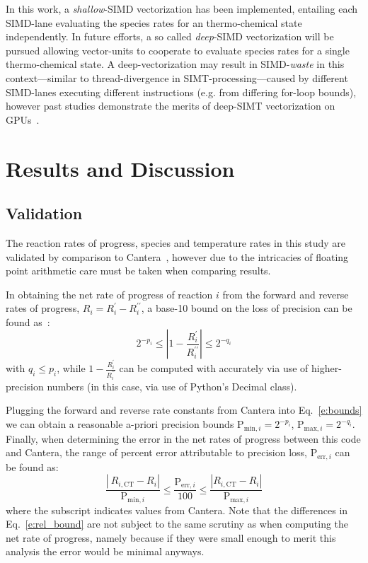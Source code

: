 \documentclass[12pt]{ussci}
\begin{document}
In this work, a \textit{shallow}-SIMD vectorization has been implemented, entailing each SIMD-lane evaluating the species rates for an thermo-chemical state independently.
In future efforts, a so called \textit{deep}-SIMD vectorization will be pursued allowing vector-units to cooperate to evaluate species rates for a single thermo-chemical state.
A deep-vectorization may result in SIMD-\textit{waste} in this context---similar to thread-divergence in SIMT-processing---caused by different SIMD-lanes executing different instructions (e.g. from differing for-loop bounds), however past studies demonstrate the merits of deep-SIMT vectorization on GPUs~\cite{Sewerin20151375}.

\section{Results and Discussion}
\subsection{Validation}
The reaction rates of progress, species and temperature rates in this study are validated by comparison to Cantera~\cite{Cantera}, however due to the intricacies of floating point arithmetic care must be taken when comparing results.

In obtaining the net rate of progress of reaction $i$ from the forward and reverse rates of progress, $R_{i} = R_{i}^{\prime} - R_{i}^{\prime\prime}$, a base-10 bound on the loss of precision can be found as~\cite{goldberg1991every}:
\begin{equation}
2^{-p_i} \le \left\lvert 1 - \frac{R_{i}^{\prime}}{R_{i}^{\prime\prime}} \right\rvert \le 2^{-q_i}
\label{e:bounds}
\end{equation}
with $q_i \le p_i$, while $1 - \frac{R_{i}^{\prime}}{R_{i}^{\prime\prime}}$ can be computed with accurately via use of higher-precision numbers (in this case, via use of Python's Decimal class).

Plugging the forward and reverse rate constants from Cantera into Eq.~\eqref{e:bounds} we can obtain a reasonable a-priori precision bounds $\text{P}_{\text{min},i} = 2^{-p_i}$, $\text{P}_{\text{max},i} = 2^{-q_i}$.
Finally, when determining the error in the net rates of progress between this code and Cantera, the range of percent error attributable to precision loss, $\text{P}_{\text{err},i}$ can be found as:
\begin{equation}
\frac{\left\lvert\ R_{i,\text{CT}} - R_{i}\right\rvert}{\text{P}_{\text{min},i}} \le
\frac{\text{P}_{\text{err},i}}{100} \le \frac{\left\lvert R_{i,\text{CT}} - R_{i} \right\rvert}{\text{P}_{\text{max},i}}
\label{e:rel_bound}
\end{equation}
where the  subscript indicates values from Cantera.
Note that the differences in Eq.~\eqref{e:rel_bound} are not subject to the same scrutiny as when computing the net rate of progress, namely because if they were small enough to merit this analysis the error would be minimal anyways.
\end{document}
